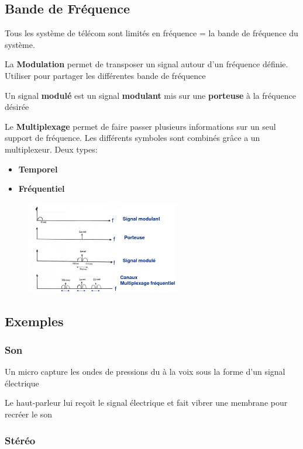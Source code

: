 	\subsection{Bande de Fréquence}
		Tous les système de télécom sont limités en fréquence = la bande de fréquence du système.
		
		La \textbf{Modulation} permet de transposer un signal autour d'un fréquence définie. Utiliser pour partager les différentes bande de fréquence
		
		Un signal \textbf{modulé} est un signal \textbf{modulant} mis sur une \textbf{porteuse} à la fréquence désirée
		
		Le \textbf{Multiplexage} permet de faire passer plusieurs informations sur un seul support de fréquence. Les différents symboles sont combinés grâce a un multiplexeur. Deux types:
		\begin{itemize}
			\item \textbf{Temporel}
			\item \textbf{Fréquentiel}
		\end{itemize}
		\begin{figure}[H]
			\centering
			\includegraphics[width=0.6\textwidth]{img/Multiplexage.png}
		\end{figure}
	\subsection{Exemples}
		\subsubsection{Son}
			Un micro capture les ondes de pressions du à la voix sous la forme d'un signal électrique
			
			Le haut-parleur lui reçoit le signal électrique et fait vibrer une membrane pour recréer le son
			
			
		\subsubsection{Stéréo}
		
